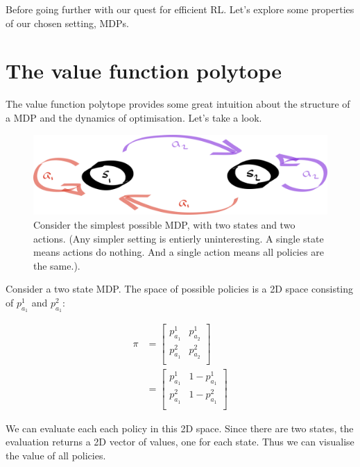 
\newpage

Before going further with our quest for efficient RL. Let's explore some
properties of our chosen setting, MDPs.


\section{The value function polytope}

The value function polytope \cite{Dadashi2018} provides some great intuition
about the structure of a MDP and the dynamics of optimisation. Let's take a look.

\begin{figure}
\centering
\includegraphics[width=1\textwidth,height=0.25\textheight]{../../pictures/drawings/2-state-automata.png}
\caption{Consider the simplest possible MDP, with two states and two actions. (Any simpler setting is entierly uninteresting. A single state means actions do nothing.
And a single action means all policies are the same.).}
\end{figure}

Consider a two state MDP. The space of possible policies is a 2D space
consisting of $p^1_{a_1}$ and $p^2_{a_1}$:

\begin{align}
\pi &=
\begin{bmatrix}
  p^1_{a_1} & p^1_{a_2} \\
  p^2_{a_1} & p^2_{a_2}\\
\end{bmatrix} \\
&=
\begin{bmatrix}
p^1_{a_1} & 1-p^1_{a_1} \\
p^2_{a_1} & 1-p^2_{a_1}\\
\end{bmatrix}
\end{align}

We can evaluate each each policy in this 2D space. Since there are two states,
the evaluation returns a 2D vector of values, one for each state. Thus we can
visualise the value of all policies.

